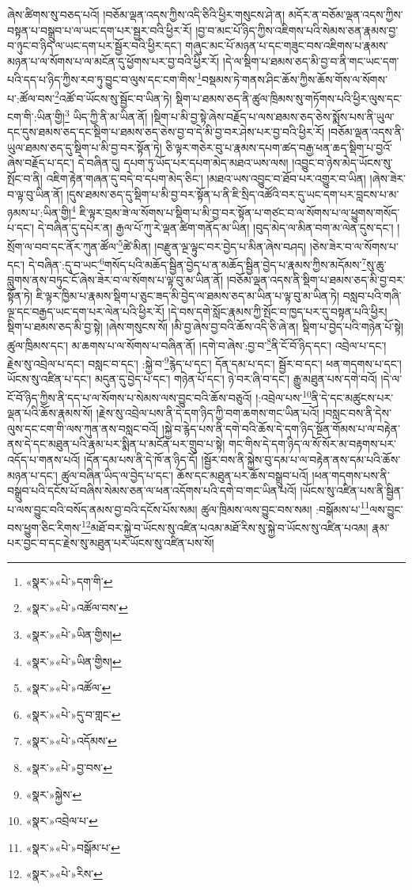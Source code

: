 ཞེས་ཚིགས་སུ་བཅད་པའོ། །བཅོམ་ལྡན་འདས་ཀྱིས་འདི་ཅིའི་ཕྱིར་གསུངས་ཤེ་ན། མདོར་ན་བཅོམ་ལྡན་འདས་ཀྱིས་བསྟན་པ་བསྒྲུབ་པ་ལ་ཡང་དག་པར་སྦྱར་བའི་ཕྱིར་རོ། །བྱ་བ་མང་པོ་ཉིད་ཀྱིས་འཇིགས་པའི་སེམས་ཅན་རྣམས་བྱ་བ་ཉུང་བ་ཉིད་ལ་ཡང་དག་པར་སྦྱོར་བའི་ཕྱིར་དང་། གཞུང་མང་པོ་མཉན་པ་དང་གཟུང་བས་འཇིགས་པ་རྣམས་མཉན་པ་ལ་སོགས་པ་ལ་མངོན་དུ་ཕྱོགས་པར་བྱ་བའི་ཕྱིར་རོ། །དེ་ལ་སྡིག་པ་ཐམས་ཅད་མི་བྱ་བ་ནི་གང་ཡང་དག་པའི་དད་པ་ཉིད་ཀྱིས་རབ་ཏུ་བྱུང་བ་ལུས་དང་ངག་གིས་\footnote{«སྣར་»«པེ་»དག་གི་}བསྡམས་ཏེ་གནས་ཤིང་ཆོས་ཀྱིས་ཆོས་གོས་ལ་སོགས་པ་:ཚོལ་བས་\footnote{«སྣར་»«པེ་»འཚོལ་བས་}འཚོ་བ་ཡོངས་སུ་སྦྱོང་བ་ཡིན་ཏེ། སྡིག་པ་ཐམས་ཅད་ནི་ཚུལ་ཁྲིམས་སུ་གཏོགས་པའི་ཕྱིར་ལུས་དང་ངག་གི་:ཡིན་གྱི།\footnote{«སྣར་»«པེ་»ཡིན་གྱིས།} ཡིད་ཀྱི་ནི་མ་ཡིན་ནོ། །སྡིག་པ་མི་བྱ་སྟེ་ཞེས་བརྗོད་པ་ལས་ཐམས་ཅད་ཅེས་སྨོས་པས་ནི་ཡུལ་དང་དུས་ཐམས་ཅད་དང་སྡིག་པ་ཐམས་ཅད་ཅེས་བྱ་བ་དེ་མི་བྱ་བར་ཤེས་པར་བྱ་བའི་ཕྱིར་རོ། །བཅོམ་ལྡན་འདས་ནི་ཡུལ་ཐམས་ཅད་དུ་སྡིག་པ་མི་བྱ་བར་སྟོན་ཏེ། ཅི་ལྟར་གཅེར་བུ་པ་རྣམས་དཔག་ཚད་བརྒྱ་ཕན་ཆད་སྡིག་པ་བྱའོ་ཞེས་བརྗོད་པ་དང་། དེ་བཞིན་དུ། དཔག་ཏུ་ཡོད་པར་དཔག་མེད་མཐའ་ཡས་ལས། །འབྱུང་བ་ཉེས་མེད་ཡོངས་སུ་སྤོང་བ་ནི། འཇིག་རྟེན་གཞན་དུ་བདེ་བ་དཔག་མེད་ཅིང་། །མཐའ་ཡས་འབྱུང་བ་ཐོབ་པར་འགྱུར་བ་ཡིན། །ཞེས་ཟེར་བ་ལྟ་བུ་ཡིན་ནོ། །དུས་ཐམས་ཅད་དུ་སྡིག་པ་མི་བྱ་བར་སྟོན་པ་ནི་ཇི་སྲིད་འཚོའི་བར་དུ་ཡང་དག་པར་བླངས་པ་མ་ཉམས་པ་:ཡིན་གྱི།\footnote{«སྣར་»«པེ་»ཡིན་གྱིས།} ཇི་ལྟར་བྲམ་ཟེ་ལ་སོགས་པ་སྡིག་པ་མི་བྱ་བར་སྟོན་པ་གཙང་བ་ལ་སོགས་པ་ལ་ཕྱུགས་གསོད་པ་དང་། དེ་བཞིན་དུ་དཔེར་ན། རྒྱལ་པོ་ཀུ་རེ་ལྡན་ཚིག་གནོད་མ་ཡིན། །བུད་མེད་ལ་མིན་བག་མ་ལེན་དུས་དང་། །སྲོག་ལ་བབ་དང་ནོར་ཀུན་ཚོལ་\footnote{«སྣར་»«པེ་»འཚོལ་}ཚེ་མིན། །བརྫུན་ལྔ་ལྟུང་བར་བྱེད་པ་མིན་ཞེས་བཤད། །ཅེས་ཟེར་བ་ལ་སོགས་པ་དང་། དེ་བཞིན་:དུ་བ་ཡང་\footnote{«སྣར་»«པེ་»དུ་བ་གླང་}གསོད་པའི་མཆོད་སྦྱིན་བྱེད་པ་ན་མཆོད་སྦྱིན་བྱེད་པ་རྣམས་ཀྱིས་མདོམས་\footnote{«སྣར་»«པེ་»འདོམས་}སུ་ཆུ་བླུགས་ནས་བཏུང་ངོ་ཞེས་ཟེར་བ་ལ་སོགས་པ་ལྟ་བུ་མ་ཡིན་ནོ། །བཅོམ་ལྡན་འདས་ནི་སྡིག་པ་ཐམས་ཅད་མི་བྱ་བར་སྟོན་ཏེ། ཇི་ལྟར་ཁྱིམ་པ་རྣམས་སྡིག་པ་ཅུང་ཟད་མི་བྱེད་ལ་ཐམས་ཅད་མ་ཡིན་པ་ལྟ་བུ་མ་ཡིན་ཏེ། བསླབ་པའི་གཞི་ལྔ་དང་བརྒྱད་ཡང་དག་པར་ལེན་པའི་ཕྱིར་རོ། །དེ་བས་དགེ་སློང་རྣམས་ཀྱི་སྤོང་བ་ཁྱད་པར་དུ་བསྟན་པའི་ཕྱིར། སྡིག་པ་ཐམས་ཅད་མི་བྱ་སྟེ། །ཞེས་གསུངས་སོ། །མི་བྱ་ཞེས་བྱ་བའི་ཆོས་འདི་ཅི་ཞེ་ན། སྡིག་པ་བྱེད་པའི་གཉེན་པོ་སྟེ། ཚུལ་ཁྲིམས་དང་། མ་ཆགས་པ་ལ་སོགས་པ་བཞིན་ནོ། །དགེ་བ་ཞེས་:བྱ་བ་\footnote{«སྣར་»«པེ་»བྱ་བས་}ནི་ངོ་བོ་ཉིད་དང་། འབྲེལ་པ་དང་། རྗེས་སུ་འབྲེལ་པ་དང་། བསླང་བ་དང་། :སྐྱེ་བ་\footnote{«སྣར་»སྐྱེས་}རྙེད་པ་དང་། དོན་དམ་པ་དང་། སྦྱོར་བ་དང་། ཕན་གདགས་པ་དང་། ཡོངས་སུ་འཛིན་པ་དང་། མདུན་དུ་བྱེད་པ་དང་། གཉེན་པོ་དང་། ཉེ་བར་ཞི་བ་དང་། རྒྱུ་མཐུན་པས་དགེ་བའོ། །དེ་ལ་ངོ་བོ་ཉིད་ཀྱིས་ནི་དད་པ་ལ་སོགས་པ་སེམས་ལས་བྱུང་བའི་ཆོས་བཅུའོ། །:འབྲེལ་པས་\footnote{«སྣར་»འབྲེལ་པ་}ནི་དེ་དང་མཚུངས་པར་ལྡན་པའི་ཆོས་རྣམས་སོ། །རྗེས་སུ་འབྲེལ་པས་ནི་དེ་དག་ཉིད་ཀྱི་བག་ཆགས་གང་ཡིན་པའོ། །བསླང་བས་ནི་དེས་ལུས་དང་ངག་གི་ལས་ཀུན་ནས་བསླང་བའོ། །སྐྱེ་བ་རྙེད་པས་ནི་དགེ་བའི་ཆོས་དེ་དག་ཉིད་སྔོན་གོམས་པ་ལ་བརྟེན་ནས་དེ་དང་མཐུན་པའི་རྣམ་པར་སྨིན་པ་མངོན་པར་གྲུབ་པ་སྟེ། གང་གིས་དེ་དག་ཉིད་ལ་སོ་སོར་མ་བརྟགས་པར་འདོད་པ་གནས་པའོ། །དོན་དམ་པས་ནི་དེ་ཁོ་ན་ཉིད་དོ། །སྦྱོར་བས་ནི་སྐྱེས་བུ་དམ་པ་ལ་བརྟེན་ནས་དམ་པའི་ཆོས་མཉན་པ་དང་། ཚུལ་བཞིན་ཡིད་ལ་བྱེད་པ་དང་། ཆོས་དང་མཐུན་པར་ཆོས་བསྒྲུབ་པའོ། །ཕན་གདགས་པས་ནི་བསྒྲུབ་པའི་དངོས་པོ་བཞིས་སེམས་ཅན་ལ་ཕན་འདོགས་པའི་དགེ་བ་གང་ཡིན་པའོ། །ཡོངས་སུ་འཛིན་པས་ནི་སྦྱིན་པ་ལས་བྱུང་བའི་བསོད་ནམས་བྱ་བའི་དངོས་པོས་སམ། ཚུལ་ཁྲིམས་ལས་བྱུང་བས་སམ། :བསྒོམས་པ་\footnote{«སྣར་»«པེ་»བསྒོམ་པ་}ལས་བྱུང་བས་ཕྱུག་ཅིང་རིགས་\footnote{«སྣར་»«པེ་»རིས་}མཐོ་བར་སྐྱེ་བ་ཡོངས་སུ་འཛིན་པའམ་མཐོ་རིས་སུ་སྐྱེ་བ་ཡོངས་སུ་འཛིན་པའམ། རྣམ་པར་བྱང་བ་དང་རྗེས་སུ་མཐུན་པར་ཡོངས་སུ་འཛིན་པས་སོ། 